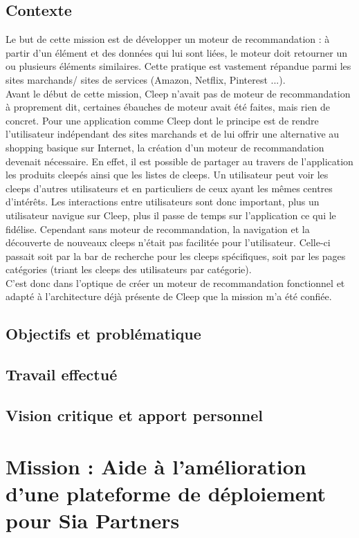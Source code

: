 \documentclass{article} %
\begin{document}
\subsection{Contexte}
Le but de cette mission est de développer un moteur de recommandation : à partir d'un élément et des données qui lui sont liées, le moteur doit retourner un ou plusieurs éléments similaires. Cette pratique est vastement répandue parmi les sites marchands/ sites de services (Amazon, Netflix, Pinterest ...).\\
Avant le début de cette mission, Cleep n'avait pas de moteur de recommandation à proprement dit, certaines ébauches de moteur avait été faites, mais rien de concret. Pour une application comme Cleep dont le principe est de rendre l'utilisateur indépendant des sites marchands et de lui offrir une alternative au shopping basique sur Internet, la création d'un moteur de recommandation devenait nécessaire. En effet, il est possible de partager au travers de l'application les produits cleepés ainsi que les listes de cleeps. Un utilisateur peut voir les cleeps d'autres utilisateurs et en particuliers de ceux ayant les mêmes centres d'intérêts. Les interactions entre utilisateurs sont donc important, plus un utilisateur navigue sur Cleep, plus il passe de temps sur l'application ce qui le fidélise. Cependant sans moteur de recommandation, la navigation et la découverte de nouveaux cleeps n'était pas facilitée pour l'utilisateur. Celle-ci passait soit par la bar de recherche pour les cleeps spécifiques, soit par les pages catégories (triant les cleeps des utilisateurs par catégorie).\\
C'est donc dans l'optique de créer un moteur de recommandation fonctionnel et adapté à l'architecture déjà présente de Cleep que la mission m'a été confiée.

\subsection{Objectifs et problématique}
\subsection{Travail effectué}
\subsection{Vision critique et apport personnel}
\newpage

\section{Mission : Aide à l'amélioration d'une plateforme de déploiement pour Sia Partners}
\end{document}
